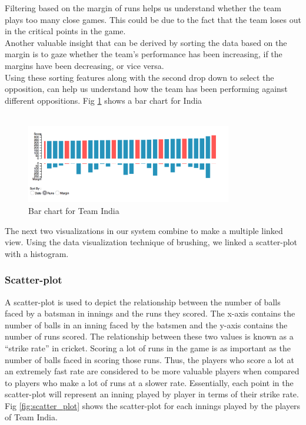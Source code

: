 \documentclass[10pt,journal,compsoc]{IEEEtran}
\begin{document}
\indent Filtering based on the margin of runs helps us understand whether the team plays too many close games. This could be due to the fact that the team loses out in the critical points in the game.\\

\indent Another valuable insight that can be derived by sorting the data based on the margin is to gaze whether the team's performance has been increasing, if the margins have been decreasing, or vice versa.\\

\indent Using these sorting features along with the second drop down to select the opposition, can help us understand how the team has been performing against different oppositions. Fig \ref{fig:bar_chart} shows a bar chart for India\\ \\ 

\begin{figure}[ht]
\includegraphics[width=9cm]{bar_chart.png}
\caption{Bar chart for Team India}
\label{fig:bar_chart}
\end{figure}

The next two visualizations in our system combine to make a multiple linked view. Using the data visualization technique of brushing, we linked a scatter-plot with a histogram.
 
\subsubsection {Scatter-plot}
A scatter-plot is used to depict the relationship between the number of balls faced by a batsman in innings and the runs they scored. The x-axis contains the number of balls in an inning faced by the batsmen and the y-axis contains the number of runs scored. The relationship between these two values is known as a ``strike rate'' in cricket. Scoring a lot of runs in the game is as important as the number of balls faced in scoring those runs. Thus, the players who score a lot at an extremely fast rate are considered to be more valuable players when compared to players who make a lot of runs at a slower rate. Essentially, each point in the scatter-plot will represent an inning played by player in terms of their strike rate. Fig \ref{fig:scatter_plot} shows the scatter-plot for each innings played by the players of Team India.
\end{document}
